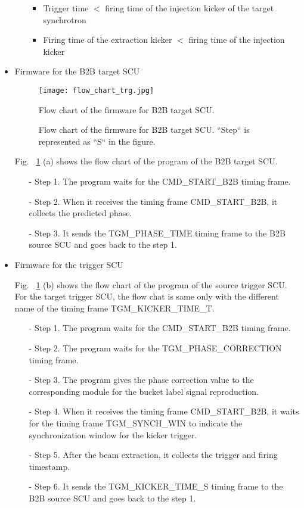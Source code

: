 \begin{itemize}
\begin{itemize}
\begin{itemize}
	\item Trigger time $<$ firing time of the injection kicker of the target synchrotron

	\item Firing time of the extraction kicker $<$ firing time of the injection kicker
\end{itemize}
 

	\end{itemize}
\item Firmware for the B2B target SCU
\begin{figure}[H]
   \centering   
   \texttt{[image: flow\_chart\_trg.jpg]}
   \caption{Flow chart of the firmware for B2B target SCU.}
	\caption*{Flow chart of the firmware for B2B target SCU. ``Step`` is represented as ``S`` in the figure.}
   \label{flow_chart_trg}
\end{figure}
Fig. ~\ref{flow_chart_trg} (a) shows the flow chart of the program of the B2B target SCU.
 	\begin{itemize}
		\item[-]Step 1. The program waits for the CMD\_START\_B2B timing frame.
 		\item[-]Step 2. When it receives the timing frame CMD\_START\_B2B, it collects the predicted phase.
		\item[-]Step 3. It sends the TGM\_PHASE\_TIME timing frame to the B2B source SCU and goes back to the step 1.
	\end{itemize}
\item Firmware for the trigger SCU

Fig. ~\ref{flow_chart_trg} (b) shows the flow chart of the program of the source trigger SCU. For the target trigger SCU, the flow chat is same only with the different name of the timing frame TGM\_KICKER\_TIME\_T.
 	\begin{itemize}
		\item[-]Step 1. The program waits for the CMD\_START\_B2B timing frame.
		\item[-]Step 2. The program waits for the TGM\_PHASE\_CORRECTION timing frame.
		\item[-]Step 3. The program gives the phase correction value to the corresponding module for the bucket label signal reproduction.
 		\item[-]Step 4. When it receives the timing frame CMD\_START\_B2B, it waits for the timing frame TGM\_SYNCH\_WIN to indicate the synchronization window for the kicker trigger.
		\item[-]Step 5. After the beam extraction, it collects the trigger and firing timestamp. 
		\item[-]Step 6. It sends the TGM\_KICKER\_TIME\_S timing frame to the B2B source SCU and goes back to the step 1.
	\end{itemize}

\end{itemize}
